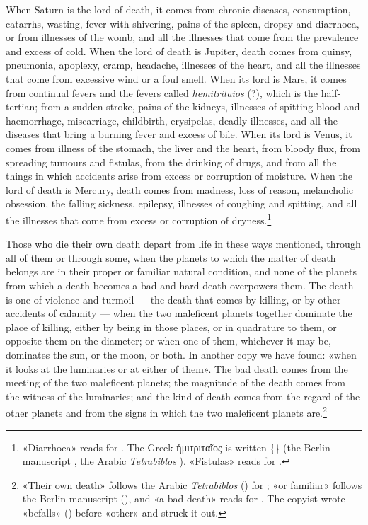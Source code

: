 \documentclass[11pt]{article}
\newcommand{\Fol}[1]{\marginpar{\footnotesize\color{gray}f.\,#1}}
\begin{document}
\par When Saturn is the lord of death, it comes from chronic diseases, consumption, catarrhs, wasting, fever with shivering, pains of the spleen, dropsy and diarrhoea, or from illnesses of the womb, and all the illnesses that come from the prevalence and excess of cold. When the lord of death is Jupiter, death comes from quinsy, pneumonia, apoplexy, cramp, headache, illnesses of the heart, and all the illnesses that come from excessive wind or a foul smell. When its lord is Mars, it comes from continual fevers and the fevers called \emph{hēmitritaios} (?), which is the half-tertian; from a sudden stroke, pains of the kidneys, illnesses of spitting blood and haemorrhage, miscarriage, childbirth, erysipelas, deadly illnesses, and all the diseases that bring a burning fever and excess of bile. When its lord is Venus, it comes from illness of the stomach, the liver and the heart, from bloody flux, from spreading tumours and fistulas, from the drinking of drugs, and from all the things in which accidents arise from excess or corruption of moisture. When the lord of death is Mercury, death comes from madness, loss of reason, melancholic obsession, the falling sickness, epilepsy, illnesses of coughing and spitting, and all the illnesses that come from excess or corruption of dryness.\footnote{«Diarrhoea» reads  for . The Greek ἡμιτριταῖος is written \{\} (the Berlin manuscript , the Arabic \emph{Tetrabiblos} ). «Fistulas» reads  for .}\par
\par \Fol{74r}Those who die their own death depart from life in these ways mentioned, through all of them or through some, when the planets to which the matter of death belongs are in their proper or familiar natural condition, and none of the planets from which a death becomes a bad and hard death overpowers them. The death is one of violence and turmoil — the death that comes by killing, or by other accidents of calamity — when the two maleficent planets together dominate the place of killing, either by being in those places, or in quadrature to them, or opposite them on the diameter; or when one of them, whichever it may be, dominates the sun, or the moon, or both. In another copy we have found: «when it looks at the luminaries or at either of them». The bad death comes from the meeting of the two maleficent planets; the magnitude of the death comes from the witness of the luminaries; and the kind of death comes from the regard of the other planets and from the signs in which the two maleficent planets are.\footnote{«Their own death» follows the Arabic \emph{Tetrabiblos} () for ; «or familiar» follows the Berlin manuscript (), and «a bad death» reads  for . The copyist wrote «befalls» () before «other» and struck it out.}\par
\end{document}
